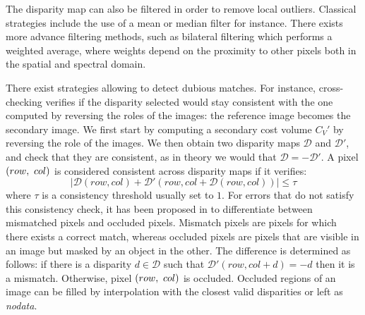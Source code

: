 The disparity map can also be filtered in order to remove local outliers. Classical strategies include the use of a mean or median filter for instance. There exists more advance filtering methods, such as bilateral filtering \cite{tomasi_bilateral_1998} which performs a weighted average, where weights depend on the proximity to other pixels both in the spatial and spectral domain.

There exist strategies allowing to detect dubious matches. For instance, cross-checking \cite{fua_combining_1991} verifies if the disparity selected would stay consistent with the one computed by reversing the roles of the images: the reference image becomes the secondary image. We first start by computing a secondary cost volume $C_V'$ by reversing the role of the images. We then obtain two disparity maps $\mathcal{D}$ and $\mathcal{D}'$, and check that they are consistent, as in theory we would that $\mathcal{D}=-\mathcal{D}'$. A pixel $(row, ~col)$ is considered consistent across disparity maps if it verifies:
\begin{equation}\label{eq:cross-checking}
    |\mathcal{D}(row, col) + \mathcal{D}'(row, col+\mathcal{D}(row, col))|\leqslant \tau
\end{equation}
where $\tau$ is a consistency threshold usually set to $1$. For errors that do not satisfy this consistency check, it has been proposed in \cite{hirschmuller_stereo_2008} to differentiate between mismatched pixels and occluded pixels. Mismatch pixels are pixels for which there exists a correct match, whereas occluded pixels are pixels that are visible in an image but masked by an object in the other. The difference is determined as follows: if there is a disparity $d\in\mathcal{D}$ such that $\mathcal{D}'(row, col+d)=-d$ then it is a mismatch. Otherwise, pixel $(row, ~col)$ is occluded. Occluded regions of an image can be filled by interpolation with the closest valid disparities or left as \textit{nodata}.  


